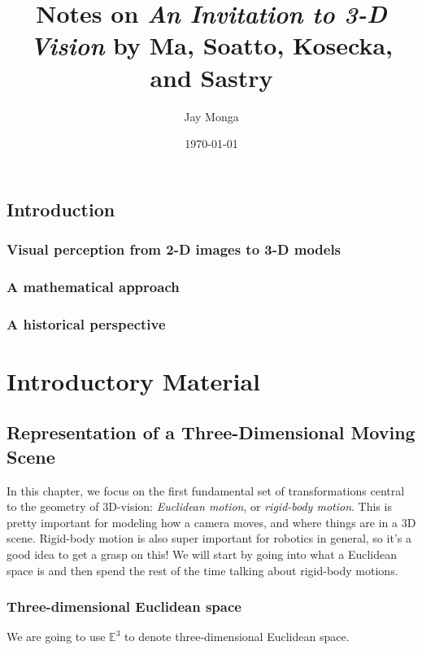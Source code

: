 \documentclass{book}
\begin{document}
\title{Notes on \textit{An Invitation to 3-D Vision} by Ma, Soatto, Kosecka, and Sastry}
\author{Jay Monga}
\date{\today}
\maketitle

\tableofcontents

\chapter{Introduction}

\section{Visual perception from 2-D images to 3-D models}

\section{A mathematical approach}

\section{A historical perspective}

\part{Introductory Material}

\chapter{Representation of a Three-Dimensional Moving Scene}

In this chapter, we focus on the first fundamental set of transformations central to the geometry of 3D-vision: \textit{Euclidean motion}, or \textit{rigid-body motion}.
This is pretty important for modeling how a camera moves, and where things are in a 3D scene.
Rigid-body motion is also super important for robotics in general, so it's a good idea to get a grasp on this!
We will start by going into what a Euclidean space is and then spend the rest of the time talking about rigid-body motions.

\section{Three-dimensional Euclidean space}
We are going to use $\mathbb{E}^3$ to denote three-dimensional Euclidean space.
\end{document}
